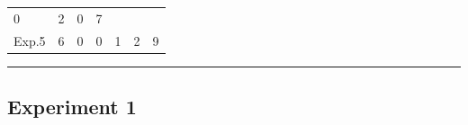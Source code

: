 \documentclass[]{article}
\begin{document}
\begin{longtable}[]{@{}lllllll@{}}
\begin{minipage}[t]{0.17\columnwidth}
0\strut
\end{minipage} & \begin{minipage}[t]{0.19\columnwidth}\raggedright\strut
2\strut
\end{minipage} & \begin{minipage}[t]{0.13\columnwidth}\raggedright\strut
0\strut
\end{minipage} & \begin{minipage}[t]{0.04\columnwidth}\raggedright\strut
7\strut
\end{minipage}\tabularnewline
\begin{minipage}[t]{0.08\columnwidth}\raggedright\strut
Exp.5\strut
\end{minipage} & \begin{minipage}[t]{0.07\columnwidth}\raggedright\strut
6\strut
\end{minipage} & \begin{minipage}[t]{0.12\columnwidth}\raggedright\strut
0\strut
\end{minipage} & \begin{minipage}[t]{0.17\columnwidth}\raggedright\strut
0\strut
\end{minipage} & \begin{minipage}[t]{0.19\columnwidth}\raggedright\strut
1\strut
\end{minipage} & \begin{minipage}[t]{0.13\columnwidth}\raggedright\strut
2\strut
\end{minipage} & \begin{minipage}[t]{0.04\columnwidth}\raggedright\strut
9\strut
\end{minipage}\tabularnewline
\bottomrule
\end{longtable}

\begin{center}\rule{0.5\linewidth}{\linethickness}\end{center}

\subsection{Experiment 1}\label{experiment-1}
\end{document}
